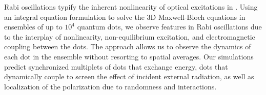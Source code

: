 Rabi oscillations typify the inherent nonlinearity of optical excitations in \qds{}.%
Using an integral equation formulation to solve  the 3D Maxwell-Bloch equations in ensembles of up to $10^4$ quantum dots, we observe features in Rabi oscillations due to the interplay of nonlinearity, non-equilibrium excitation, and electromagnetic coupling between the dots.
The approach allows us to observe the dynamics of each dot in the ensemble without resorting to spatial averages.
Our simulations predict synchronized multiplets of dots that exchange energy, dots that dynamically couple to screen the effect of incident external radiation, as well as localization of the polarization due to randomness and interactions. 

